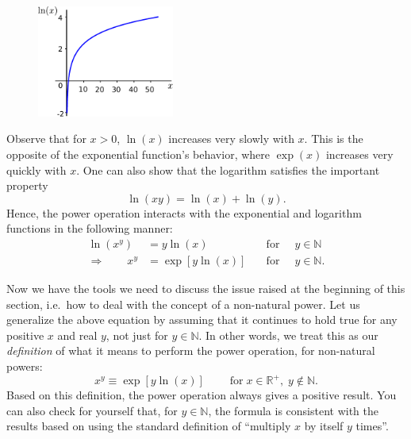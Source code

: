 \documentclass[10pt,a4paper]{article}
\begin{document}
\begin{figure}[h]
  \centering\includegraphics[width=0.4\textwidth]{logarithm}
\end{figure}
Observe that for $x>0$, $\ln(x)$ increases very slowly with $x$.  This
is the opposite of the exponential function's behavior, where
$\exp(x)$ increases very quickly with $x$. One can also show that the
logarithm satisfies the important property
\begin{equation}
\ln(xy) = \ln(x) + \ln(y).
\end{equation}
Hence, the power operation interacts with the exponential and
logarithm functions in the following manner:
\begin{align}
  \ln(x^y) &= y \ln(x)\qquad\quad&\mathrm{for}&\;\;y \in \mathbb{N} \\
  \Rightarrow\quad\quad x^y &= \exp[y \ln(x)] \quad &\mathrm{for}&\;\;y \in \mathbb{N}.
\end{align}

Now we have the tools we need to discuss the issue raised at the
beginning of this section, i.e.~how to deal with the concept of a
non-natural power. Let us generalize the above equation by assuming that
it continues to hold true for any positive $x$ and real $y$, not
just for $y \in \mathbb{N}$. In other words, we treat this as our
\emph{definition} of what it means to perform the power operation, for
non-natural powers:
\begin{equation}
  x^y \equiv \exp[y \ln(x)] \qquad\; \mathrm{for}\; x \in \mathbb{R}^+, \;y \notin \mathbb{N}.
  \label{powerdef}
\end{equation}
Based on this definition, the power operation always gives a positive
result. You can also check for yourself that, for $y \in \mathbb{N}$,
the formula is consistent with the results based on using the standard
definition of ``multiply $x$ by itself $y$ times''.
\end{document}
